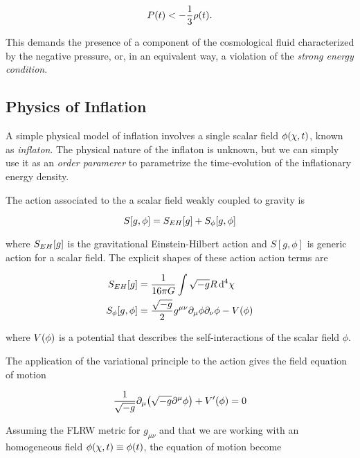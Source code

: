 \begin{equation}
        P\qty(t) < -\frac{1}{3} \rho\qty(t).
\end{equation}

This demands the presence of a component of the cosmological fluid
characterized by the negative pressure, or, in an equivalent way, a
violation of the \emph{strong energy condition}.

\subsection{Physics of Inflation}

A simple physical model of inflation involves a single scalar field
$\phi\qty(\vb{\chi},t)$, known as \emph{inflaton}. The physical nature of
the inflaton is unknown, but we can simply use it as an \emph{order
paramerer} to parametrize the time-evolution of the inflationary energy
density.

The action associated to the a scalar field weakly coupled to gravity is

\begin{equation}
        S\qty[g,\phi] = S_{EH}\qty[g] + S_\phi\qty[g,\phi]
\end{equation}

where $S_{EH}\qty[g]$ is the gravitational Einstein-Hilbert action and
$S[g,\phi]$ is generic action for a scalar field. The explicit shapes of
these action action terms are

\begin{align}
        S_{EH}[g] & = \frac{1}{16\pi G} \int \sqrt{-g} R \dd[4]{\chi} \\
        S_\phi[g,\phi] & = \frac{\sqrt{-g}}{2}
        g^{\mu \nu}\partial_\mu\phi\partial_\nu\phi - V\qty(\phi)
\end{align}

where $V\qty(\phi)$ is a potential that describes the self-interactions of
the scalar field $\phi$.

The application of the variational principle to the action gives the
field equation of motion

\begin{equation}
        \frac{1}{\sqrt{-g}} \partial_\mu\qty(\sqrt{-g} \partial^\mu\phi) +
        V'\qty(\phi) = 0
\end{equation}

Assuming the FLRW metric for $g_{\mu \nu}$ and that we are working with an
homogeneous field $\phi\qty(\vb{\chi},t) \equiv \phi\qty(t)$, the equation
of motion become

